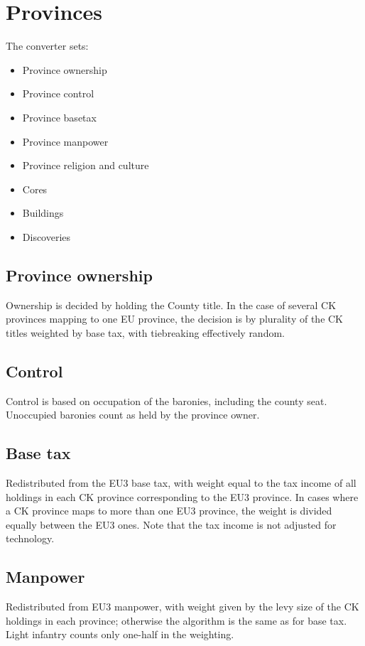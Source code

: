 \documentclass[12pt,ebook,oneside]{book}
\begin{document}
\chapter{Provinces}
The converter sets:
\begin{itemize}
\item Province ownership
\item Province control
\item Province basetax
\item Province manpower 
\item Province religion and culture
\item Cores
\item Buildings
\item Discoveries
\end{itemize}

\section{Province ownership}

Ownership is decided by holding the County title. In the case
of several CK provinces mapping to one EU province, the decision
is by plurality of the CK titles weighted by base tax, with 
tiebreaking effectively random.

\section{Control}

Control is based on occupation of the baronies, including the
county seat. Unoccupied baronies count as held by the province 
owner. 

\section{Base tax}

Redistributed from the EU3 base tax, with weight equal to
the tax income of all holdings in each CK province corresponding
to the EU3 province. In cases where a CK province maps to more
than one EU3 province, the weight is divided equally between the
EU3 ones. Note that the tax income is not adjusted for technology. 

\section{Manpower}

Redistributed from EU3 manpower, with weight given by the levy
size of the CK holdings in each province; otherwise the algorithm
is the same as for base tax. Light infantry counts only
one-half in the weighting. 
\end{document}

